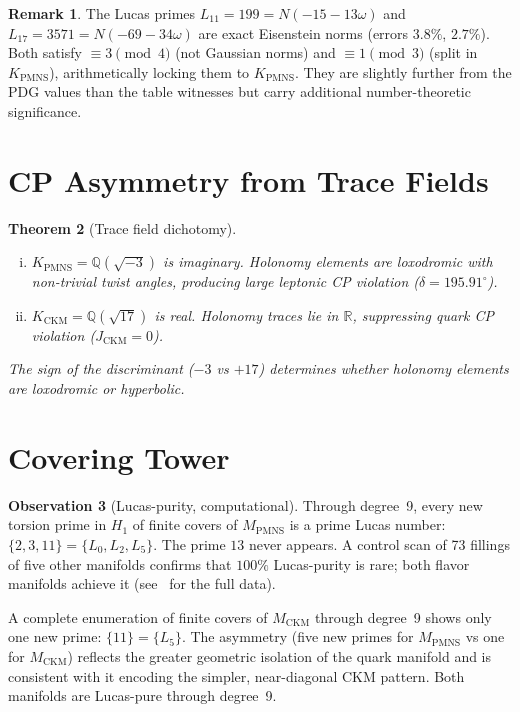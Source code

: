 \documentclass[11pt,a4paper]{article}
\newtheorem{theorem}{Theorem}
\theoremstyle{definition}
\newtheorem{observation}[theorem]{Observation}
\newtheorem{remark}[theorem]{Remark}
\newcommand{\MPMNS}{M_{\mathrm{PMNS}}}
\newcommand{\KPMNS}{K_{\mathrm{PMNS}}}
\begin{document}
\begin{remark}
The Lucas primes $L_{11}=199=N(-15-13\omega)$ and
$L_{17}=3571=N(-69-34\omega)$ are exact Eisenstein norms
(errors $3.8\%$, $2.7\%$).
Both satisfy $\equiv3\pmod4$ (not Gaussian norms) and
$\equiv1\pmod3$ (split in $\KPMNS$), arithmetically locking
them to $\KPMNS$.
They are slightly further from the PDG values than the
table witnesses but carry additional number-theoretic significance.
\end{remark}

\section{CP Asymmetry from Trace Fields}
\label{sec:trace_fields}

\begin{theorem}[Trace field dichotomy]
\label{thm:dichotomy}
\begin{enumerate}[(i)]
\item $\KPMNS=\mathbb{Q}(\sqrt{-3})$ is imaginary.
  Holonomy elements are loxodromic with non-trivial twist angles,
  producing large leptonic CP violation ($\delta=195.91^\circ$).
\item $K_{\mathrm{CKM}}=\mathbb{Q}(\sqrt{17})$ is real.
  Holonomy traces lie in $\mathbb{R}$, suppressing quark CP
  violation ($J_{\mathrm{CKM}}=0$).
\end{enumerate}
The sign of the discriminant ($-3$ vs $+17$) determines whether
holonomy elements are loxodromic or hyperbolic.
\end{theorem}

\section{Covering Tower}
\label{sec:covering}

\begin{observation}[Lucas-purity, computational]
Through degree~9, every new torsion prime in $H_1$ of finite covers
of $\MPMNS$ is a prime Lucas number:
$\{2,3,11\}=\{L_0,L_2,L_5\}$.
The prime $13$ never appears.
A control scan of 73 fillings of five other manifolds confirms that
$100\%$ Lucas-purity is rare; both flavor manifolds achieve it
(see~\cite{Gentry:Covering} for the full data).

A complete enumeration of finite covers of $M_{\mathrm{CKM}}$ through
degree~9 shows only one new prime: $\{11\}=\{L_5\}$.
The asymmetry (five new primes for $\MPMNS$ vs one for $M_{\mathrm{CKM}}$)
reflects the greater geometric isolation of the quark manifold and
is consistent with it encoding the simpler, near-diagonal CKM pattern.
Both manifolds are Lucas-pure through degree~9.
\end{observation}
\end{document}
